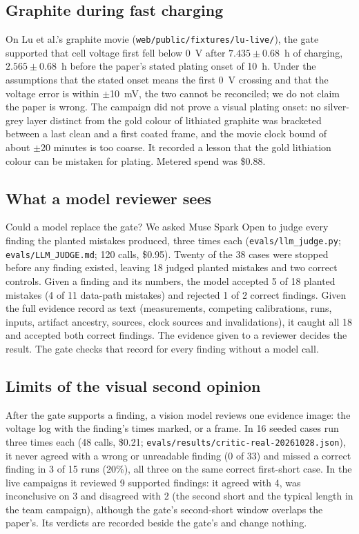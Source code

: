 \documentclass[11pt]{article}
\newcommand{\cmd}[1]{\texttt{#1}}
\begin{document}
\subsection{Graphite during fast charging}
On Lu et al.'s graphite movie (\cmd{web/public/fixtures/lu-live/}), the gate supported that cell voltage first fell
below 0~V after $7.435 \pm 0.68$~h of charging, $2.565 \pm 0.68$~h before the paper's stated plating onset of 10~h.
Under the assumptions that the stated onset means the first 0~V crossing and that the voltage error is within
$\pm$10~mV, the two cannot be reconciled; we do not claim the paper is wrong. The campaign did not prove a visual
plating onset: no silver-grey layer distinct from the gold colour of lithiated graphite was bracketed between a last
clean and a first coated frame, and the movie clock bound of about $\pm$20 minutes is too coarse. It recorded a lesson
that the gold lithiation colour can be mistaken for plating. Metered spend was \$0.88.

\subsection{What a model reviewer sees}
Could a model replace the gate? We asked Muse Spark Open to judge every finding the planted mistakes produced, three
times each (\cmd{evals/llm\_judge.py}; \cmd{evals/LLM\_JUDGE.md}; 120 calls, \$0.95). Twenty of the 38 cases were
stopped before any finding existed, leaving 18 judged planted mistakes and two correct controls. Given a finding and
its numbers, the model accepted 5 of 18 planted mistakes (4 of 11 data-path mistakes) and rejected 1 of 2 correct
findings. Given the full evidence record as text (measurements, competing calibrations, runs, inputs, artifact
ancestry, sources, clock sources and invalidations), it caught all 18 and accepted both correct findings. The
evidence given to a reviewer decides the result. The gate checks that record for every finding without a model call.

\subsection{Limits of the visual second opinion}
After the gate supports a finding, a vision model reviews one evidence image: the voltage log with the finding's
times marked, or a frame. In 16 seeded cases run three times each (48 calls, \$0.21;
\cmd{evals/results/critic-real-20261028.json}), it never agreed with a wrong or unreadable finding (0 of 33) and missed
a correct finding in 3 of 15 runs (20\%), all three on the same correct first-short case. In the live campaigns it
reviewed 9 supported findings: it agreed with 4, was inconclusive on 3 and disagreed with 2 (the second short and the
typical length in the team campaign), although the gate's second-short window overlaps the paper's. Its verdicts are
recorded beside the gate's and change nothing.
\end{document}
